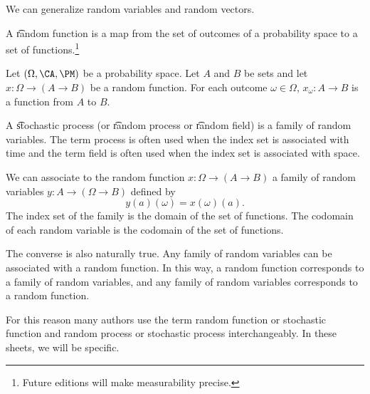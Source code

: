 

We can generalize random variables and random vectors.


A \t{random function} is a map from the set of outcomes of a probability space to a set of functions.\footnote{Future editions will make measurability precise.}


Let $(\Omega, \CA, \PM)$ be a probability space.
Let $A$ and $B$ be sets and let $x: \Omega \to (A \to B)$ be a random function.
For each outcome $\omega \in \Omega$, $x_{\omega}: A \to B$ is a function from $A$ to $B$.


A \t{stochastic process} (or \t{random process} or \t{random field}) is a family of random variables.
The term process is often used when the index set is associated with time and the term field is often used when the index set is associated with space.

We can associate to the random function $x: \Omega \to (A \to B)$ a family of random variables $y: A \to (\Omega \to B)$ defined by
\[
  y(a)(\omega) = x(\omega)(a).
\]
The index set of the family is the domain of the set of functions.
The codomain of each random variable is the codomain of the set of functions.

The converse is also naturally true.
Any family of random variables can be associated with a random function.
In this way, a random function corresponds to a family of random variables, and any family of random variables corresponds to a random function.

For this reason many authors use the term random function or stochastic function and random process or stochastic process interchangeably.
In these sheets, we will be specific.

